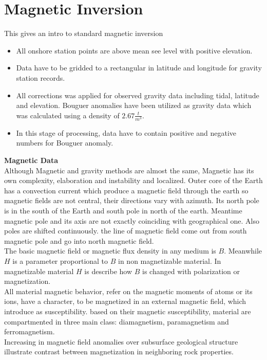 \chapter{Magnetic Inversion}\label{Chp:cook:magnetic inversion}
This gives an intro to standard magnetic inversion


\begin{itemize}
\item All onshore station points are above mean see level with positive
elevation.

\item Data have to be gridded to a rectangular in latitude and longitude
for gravity station records.

\item All corrections was applied for observed gravity data including
tidal, latitude and elevation. Bouguer anomalies have been utilized as
gravity data which was calculated using a density of $2.67 \frac{t}{m^3}$.

\item In this stage of processing, data have to contain positive and
negative numbers for Bouguer anomaly.
\end{itemize}

\textbf{Magnetic Data} \\

Although Magnetic and gravity methods are almost the same, Magnetic has its own complexity, elaboration and instability and localized. Outer core of the Earth has a convection current which produce a magnetic field through the earth so magnetic fields are not central, their directions vary with azimuth. Its north pole is in the south of the Earth and south pole in north of the earth. Meantime magnetic pole and its axis are not exactly coinciding with geographical one. Also poles are shifted continuously. the line of magnetic field come out from south magnetic pole and go into north magnetic field. \\
The basic magnetic field or magnetic flux density in any medium is $B$. Meanwhile $H$ is a parameter proportional to $B$ in non magnetizable material. In magnetizable material $H$ is describe how $B$ is changed with polarization or magnetization.\\
All material magnetic behavior, refer on the magnetic moments of atoms or its ions, have a character, to be magnetized in an external magnetic field, which introduce as susceptibility. based on their magnetic susceptibility, material are compartmented in three main class: diamagnetism, paramagnetism and ferromagnetism.\\
Increasing in magnetic field anomalies over subsurface geological structure illustrate contrast between magnetization in neighboring rock properties.\\

